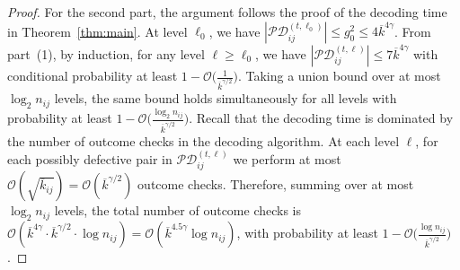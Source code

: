 \documentclass[journal]{IEEEtran}
\newtheorem{lemma}{Lemma}
\theoremstyle{definition}
\theoremstyle{definition}
\newcommand{\Tc}{\mathcal{T}}
\newcommand{\PV}{\nu}
\newcommand{\kb}{\overline{k}}
\DeclarePairedDelimiter\ceil{\lceil}{\rceil}
\newcommand{\bigO}{\mathcal{O}}
\begin{document}
\begin{proof}
For the second part, the argument follows the proof of the decoding time in Theorem~\ref{thm:main}. At level $\ell_0$, we have $|\mathcal{PD}_{ij}^{(t,\ell_0)}| \le g_0^2 \le 4\kb^{4\gamma}$. From part~\textup{(1)}, by induction, for any level $\ell \ge \ell_0$, we have $|\mathcal{PD}_{ij}^{(t,\ell)}| \le 7\kb^{4\gamma}$ with conditional probability at least $1-\bigO \big( \tfrac{1}{\kb^{\gamma/2}}\big)$. Taking a union bound over at most $\log_2 n_{ij}$ levels, the same bound holds simultaneously for all levels with probability at least $1-\bigO \big( \tfrac{\log_2 n_{ij}}{\kb^{\gamma/2}} \big)$. Recall that the decoding time is dominated by the number of outcome checks in the decoding algorithm. At each level $\ell$, for each possibly defective pair in $\mathcal{PD}_{ij}^{(t,\ell)}$ we perform at most $\bigO(\sqrt{\kb_{ij}})=\bigO(\kb^{\gamma/2})$ outcome checks. Therefore, summing over at most $\log_2 n_{ij}$ levels, the total number of outcome checks is $\bigO(\kb^{4\gamma}\cdot \kb^{\gamma/2}\cdot \log n_{ij})=\bigO(\kb^{4.5\gamma}\log n_{ij})$, with probability at least $1-\bigO \big( \tfrac{\log n_{ij}}{\kb^{\gamma/2}}\big)$.
\end{proof}




\end{document}
